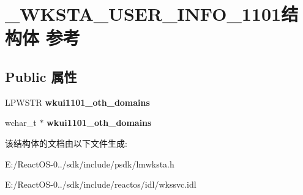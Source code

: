 \hypertarget{struct___w_k_s_t_a___u_s_e_r___i_n_f_o__1101}{}\section{\+\_\+\+W\+K\+S\+T\+A\+\_\+\+U\+S\+E\+R\+\_\+\+I\+N\+F\+O\+\_\+1101结构体 参考}
\label{struct___w_k_s_t_a___u_s_e_r___i_n_f_o__1101}
\subsection*{Public 属性}
\begin{DoxyCompactItemize}
\item 
\mbox{\label{struct___w_k_s_t_a___u_s_e_r___i_n_f_o__1101_abba3e5ca96c0ff9f3bc9cf12e9e0bb88}} 
L\+P\+W\+S\+TR {\bfseries wkui1101\+\_\+oth\+\_\+domains}
\item 
\mbox{\label{struct___w_k_s_t_a___u_s_e_r___i_n_f_o__1101_aebaaf3efb82a9e0bb4e212920c2d4781}} 
wchar\+\_\+t $\ast$ {\bfseries wkui1101\+\_\+oth\+\_\+domains}
\end{DoxyCompactItemize}


该结构体的文档由以下文件生成\+:\begin{DoxyCompactItemize}
\item 
E\+:/\+React\+O\+S-\/0../sdk/include/psdk/lmwksta.\+h\item 
E\+:/\+React\+O\+S-\/0../sdk/include/reactos/idl/wkssvc.\+idl\end{DoxyCompactItemize}
